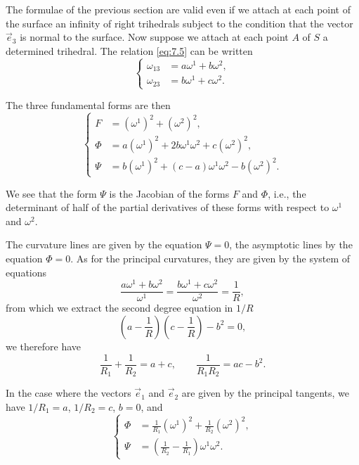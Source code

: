 \documentclass[leqno,11pt]{book}
\numberwithin{equation}{chapter}
\theoremstyle{shape1}
\theoremstyle{shape0}
\theoremstyle{shape2}
\theoremstyle{definition}
\begin{document}
\vspace{12pt}\fsec The formulae of the previous section are valid even if we attach at each point of the surface an infinity of right trihedrals subject to the condition that the vector $\vec e_{3}$ is normal to the surface. Now suppose we attach at each point $A$ of $S$ a determined trihedral. The relation \eqref{eq:7.5} can be written
\begin{equation}
  \label{eq:7.13}
  \left\{
    \begin{aligned}
      \omega_{13}&=a\omega^{1}+b\omega^{2},\\
      \omega_{23}&=b\omega^{1}+c\omega^{2}.
    \end{aligned}
  \right.
\end{equation}

\label{pageref1}
The three fundamental forms are then
\begin{equation}
  \label{eq:7.14}
  \left\{
    \begin{aligned}
      F&=(\omega^{1})^{2}+(\omega^{2})^{2},\\
      \Phi&=a(\omega^{1})^{2}+2b\omega^{1}\omega^{2}+c(\omega^{2})^{2},\\
      \Psi&=b(\omega^{1})^{2}+(c-a)\omega^{1}\omega^{2}-b(\omega^{2})^{2}.
    \end{aligned}
  \right.
\end{equation}

We see that the form $\Psi$ is the Jacobian of the forms $F$ and $\Phi$, i.e., the determinant of half of the partial derivatives of these forms with respect to $\omega^{1}$ and $\omega^{2}$.

The curvature lines are given by the equation $\Psi=0$, the asymptotic lines by the equation $\Phi=0$. As for the principal curvatures, they are given by the system of equations
\[
\frac{a\omega^{1}+b\omega^{2}}{\omega^{1}}=\frac{b\omega^{1}+c\omega^{2}}{\omega^{2}}=\frac{1}{R},
\]
from which we extract the second degree equation in $1/R$
\begin{equation}
  \label{eq:7.15}
  \left(a-\frac{1}{R}\right)
  \left(c-\frac{1}{R}\right)
  -b^{2}=0,
\end{equation}
we therefore have
\begin{equation}
  \label{eq:7.15'}
  \tag{15$'$}
  \frac{1}{R_{1}}+\frac{1}{R_{2}}=a+c,\qquad \frac{1}{R_{1}R_{2}}=ac-b^{2}.
\end{equation}

In the case where the vectors $\vec e_{1}$ and $\vec e_{2}$ are given by the principal tangents, we have $1/R_{1}=a$, $1/R_{2}=c$, $b=0$, and
\begin{equation}
  \label{eq:7.16}
  \left\{
    \begin{aligned}
      \Phi&=\frac{1}{R_{1}}(\omega^{1})^{2}+\frac{1}{R_{2}}(\omega^{2})^{2},\\
      \Psi&=\left(\frac{1}{R_{2}}-\frac{1}{R_{1}}\right)\omega^{1}\omega^{2}.
    \end{aligned}
  \right.
\end{equation}
\end{document}
